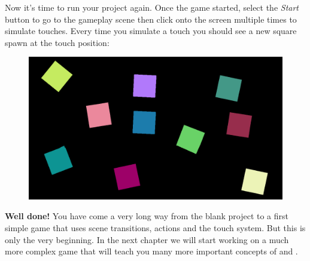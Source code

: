 Now it's time to run your project again. Once the game started,
select the \textit{Start} button to go to the gameplay scene then click onto the
screen multiple times to simulate touches. Every time you simulate a touch you
should see a new square spawn at the touch position:
\begin{figure}[H]
		\centering
		\includegraphics[width=350pt]{images/firstproject/spinning_squares.png}
\end{figure}
\textbf{Well done!} You have come a very long way from the blank project to a
first simple game that uses scene transitions, actions and the \cocos{} touch
system. But this is only the very beginning. In the next chapter we will start
working on a much more complex game that will teach you many more important
concepts of \SB{} and \cocos{}. 